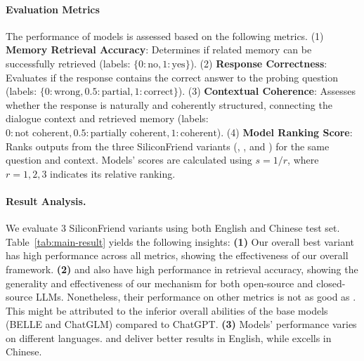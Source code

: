 
\saveSpaceSec
\paragraph{Evaluation Metrics}

The performance of models is assessed based on the following metrics. 
(1) \textbf{Memory Retrieval Accuracy}: Determines if related memory can be successfully retrieved (labels: $\{0:\text{no}, 1: \text{yes}\}$).
(2) \textbf{Response Correctness}: Evaluates if the response contains the correct answer to the probing question (labels: $\{0:\text{wrong}, 0.5: \text{partial}, 1: \text{correct}\}$).
(3) \textbf{Contextual Coherence}: Assesses whether the response is naturally and coherently structured, connecting the dialogue context and  retrieved memory (labels: ${0:\text{not coherent}, 0.5:\text{partially coherent}, 1:\text{coherent}}$).
(4) \textbf{Model Ranking Score}: Ranks outputs from the three SiliconFriend variants (\chatbotchatglm, \chatbotchatgpt, and \chatbotbelle) for the same question and context. Models' scores are calculated using $s = 1/r$, where $r={1,2,3}$ indicates its relative ranking.

\saveSpaceSec
\paragraph{Result Analysis.}
We evaluate 3 SiliconFriend variants using both English and Chinese test set. Table~\ref{tab:main-result} yields the following insights: 
\textbf{(1)} Our overall best variant \chatbotchatgpt has high performance across all metrics, showing the effectiveness of our overall framework.
\textbf{(2)} \chatbotbelle and \chatbotchatglm also have high  performance in retrieval accuracy, showing the generality and effectiveness of our \method mechanism for both open-source and closed-source LLMs. Nonetheless, their performance on other metrics is not as good as \chatbotchatgpt. This might be attributed to the inferior overall abilities of the base models (BELLE and ChatGLM) compared to ChatGPT.
\textbf{(3)} Models' performance varies on different languages. \chatbotchatglm and \chatbotchatgpt deliver better results in English, while \chatbotbelle excells in Chinese.

